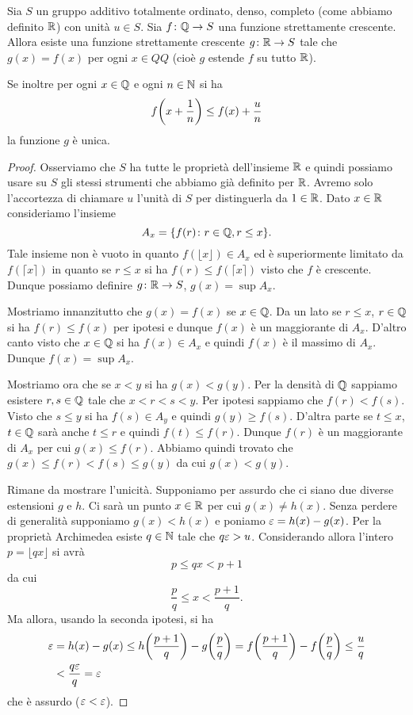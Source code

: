 \begin{lemma}
Sia $S$ un gruppo additivo totalmente ordinato, denso, completo 
(come abbiamo definito $\mathbb R$) con unità $u\in S$.
Sia $f\colon \mathbb Q\to S$ una funzione strettamente crescente.
Allora esiste una funzione strettamente crescente $g\colon \mathbb R\to S$ 
tale che $g(x)=f(x)$ per ogni $x\in QQ$ (cioè $g$ estende $f$ su tutto $\mathbb R$).

Se inoltre per ogni $x\in \mathbb Q$ e ogni $n\in \mathbb N$ si ha
\[
  f{\left( x+\frac 1 n \right)} \le f(x) + \frac{u}{n}
\]
la funzione $g$ è unica.
\end{lemma}
%
\begin{proof}
Osserviamo che $S$ ha tutte le proprietà dell'insieme $\mathbb R$ e quindi possiamo usare 
su $S$ gli stessi strumenti che abbiamo già definito per $\mathbb R$. 
Avremo solo l'accortezza di chiamare $u$ l'unità di $S$ per distinguerla da $1\in\mathbb R$.
Dato $x\in \mathbb R$ consideriamo l'insieme 
\[
    A_x = {\left\{ f(r)\colon r\in \mathbb Q, r\le x \right\}}.
\]
Tale insieme non è vuoto in quanto $f(\lfloor x\rfloor)\in A_x$ 
ed è superiormente limitato da $f(\lceil x\rceil)$ in quanto se $r\le x$ 
si ha $f(r) \le f(\lceil x \rceil)$ visto che $f$ è crescente.
Dunque possiamo definire $g\colon \mathbb R\to S$, $g(x) = \sup A_x$. 

Mostriamo innanzitutto che $g(x)=f(x)$ se $x\in \mathbb Q$. 
Da un lato se $r\le x$, $r\in \mathbb Q$ si ha $f(r)\le f(x)$ per ipotesi 
e dunque $f(x)$ è un maggiorante di $A_x$. 
D'altro canto visto che $x\in \mathbb Q$ si ha $f(x)\in A_x$ e quindi 
$f(x)$ è il massimo di $A_x$. Dunque $f(x) = \sup A_x$.

Mostriamo ora che se $x < y$ si ha $g(x) < g(y)$.
Per la densità di $\mathbb Q$ sappiamo esistere $r,s\in \mathbb Q$ tale che $x < r < s < y$.
Per ipotesi sappiamo che $f(r)<f(s)$.
Visto che $s\le y$ si ha $f(s) \in A_y$ e quindi $g(y)\ge f(s)$.
D'altra parte se $t\le x$, $t \in \mathbb Q$ sarà anche $t\le r$ e quindi $f(t)\le f(r)$.
Dunque $f(r)$ è un maggiorante di $A_x$ per cui $g(x)\le f(r)$.
Abbiamo quindi trovato che $g(x) \le f(r) < f(s) \le g(y)$ da cui $g(x) < g(y)$.

Rimane da mostrare l'unicità.
Supponiamo per assurdo che ci siano due diverse estensioni $g$ e $h$. 
Ci sarà un punto 
$x\in\mathbb R$ per cui $g(x)\neq h(x)$. 
Senza perdere di generalità supponiamo $g(x)<h(x)$ e poniamo $\varepsilon = h(x) - g(x)$.
Per la proprietà Archimedea esiste $q\in \mathbb N$ tale che $q \varepsilon > u$.
Considerando allora l'intero $p = \lfloor qx\rfloor$ si avrà
\[
  p \le qx < p+1  
\]
da cui 
\[
  \frac p q \le x < \frac{p+1}q.
\]
Ma allora, usando la seconda ipotesi, si ha 
\begin{align*}
  \varepsilon & = h(x) - g(x) \le h{\left( \frac{p+1}q \right)} - g{\left( \frac p q \right)}
   = f{\left( \frac{p+1}q \right)}-f{\left( \frac p q \right)}
   \le \frac{u}{q} \\ 
   &< \frac{q\varepsilon}{q} = \varepsilon
\end{align*}
che è assurdo ($\varepsilon<\varepsilon$).
\end{proof}

